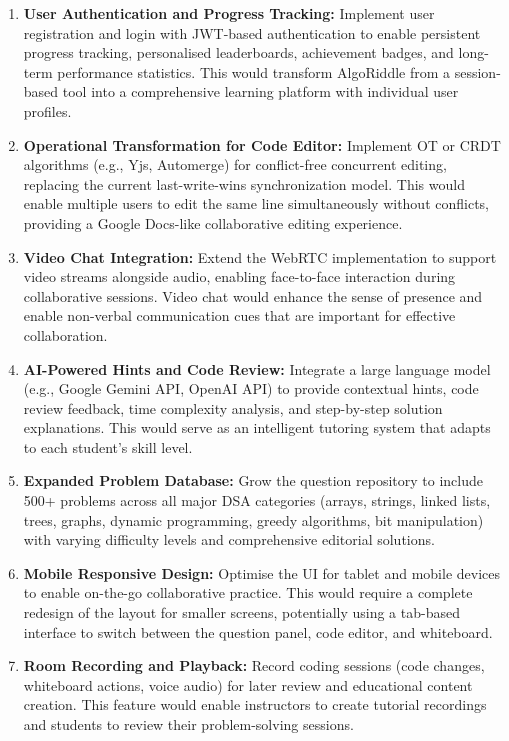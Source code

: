 \begin{enumerate}[label=\arabic*.]
    \item \textbf{User Authentication and Progress Tracking:} Implement user registration and login with JWT-based authentication to enable persistent progress tracking, personalised leaderboards, achievement badges, and long-term performance statistics. This would transform AlgoRiddle from a session-based tool into a comprehensive learning platform with individual user profiles.
    \item \textbf{Operational Transformation for Code Editor:} Implement OT or CRDT algorithms (e.g., Yjs, Automerge) for conflict-free concurrent editing, replacing the current last-write-wins synchronization model. This would enable multiple users to edit the same line simultaneously without conflicts, providing a Google Docs-like collaborative editing experience.
    \item \textbf{Video Chat Integration:} Extend the WebRTC implementation to support video streams alongside audio, enabling face-to-face interaction during collaborative sessions. Video chat would enhance the sense of presence and enable non-verbal communication cues that are important for effective collaboration.
    \item \textbf{AI-Powered Hints and Code Review:} Integrate a large language model (e.g., Google Gemini API, OpenAI API) to provide contextual hints, code review feedback, time complexity analysis, and step-by-step solution explanations. This would serve as an intelligent tutoring system that adapts to each student's skill level.
    \item \textbf{Expanded Problem Database:} Grow the question repository to include 500+ problems across all major DSA categories (arrays, strings, linked lists, trees, graphs, dynamic programming, greedy algorithms, bit manipulation) with varying difficulty levels and comprehensive editorial solutions.
    \item \textbf{Mobile Responsive Design:} Optimise the UI for tablet and mobile devices to enable on-the-go collaborative practice. This would require a complete redesign of the layout for smaller screens, potentially using a tab-based interface to switch between the question panel, code editor, and whiteboard.
    \item \textbf{Room Recording and Playback:} Record coding sessions (code changes, whiteboard actions, voice audio) for later review and educational content creation. This feature would enable instructors to create tutorial recordings and students to review their problem-solving sessions.

\end{enumerate}
